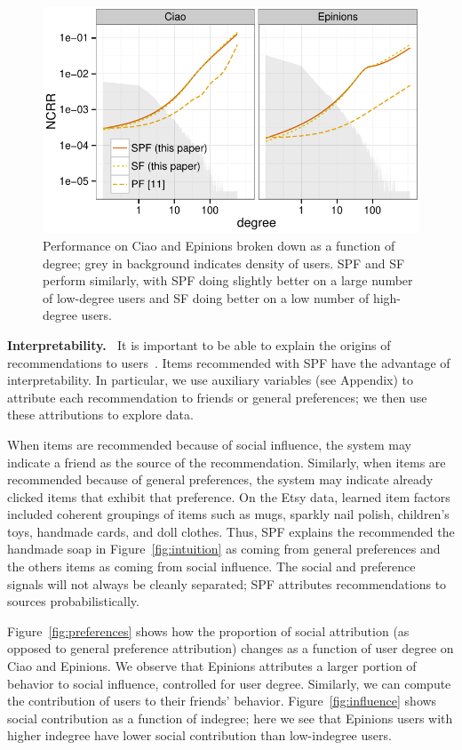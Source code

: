 \documentclass{sig-alternate-2013}
\newcommand{\mypar}[1]{\vspace{0.05in} \noindent \textbf{#1 \,}}
\begin{document}
\begin{figure}[ht]
\hspace{-10px}
\includegraphics[width=\columnwidth]{../fig/ncrr_by_degree.pdf}
\caption{Performance on Ciao and Epinions broken down as a function of degree;
grey in background indicates density of users.  SPF and SF
perform similarly, with SPF doing slightly better on a large number of low-degree users
and SF doing better on a low number of high-degree users.}\label{fig:degree}
\end{figure}

\mypar{Interpretability.}  It is important to be able to explain the
origins of recommendations to users~\cite{Herlocker2000}.  Items
recommended with SPF have the advantage of interpretability.
In particular, we use auxiliary variables (see Appendix) to attribute each recommendation to friends or general preferences; we then use these attributions to explore data.

When items are recommended because
of social influence, the system may indicate a friend as the source of
the recommendation.
Similarly, when items are recommended because of general preferences, the system may indicate already clicked items that
exhibit that preference.
On the Etsy data, learned item factors included coherent groupings of items such as
mugs, sparkly nail polish, children's toys, handmade cards, and doll clothes.
Thus, SPF explains the recommended the handmade soap in Figure~\ref{fig:intuition}
as coming from general preferences and the others items as coming from social influence.
The social and preference signals will not always be cleanly separated; SPF attributes recommendations to sources probabilistically.

Figure~\ref{fig:preferences} shows how the proportion of social attribution (as opposed to
general preference attribution) changes as a function of user degree on Ciao and Epinions.  We observe that Epinions attributes a larger portion of behavior to social influence, controlled for user degree.  Similarly,
we can compute the contribution of users to their friends' behavior. Figure~\ref{fig:influence} shows social contribution as a function of indegree; here we see that Epinions users with higher indegree have lower social contribution than low-indegree users.
\end{document}

